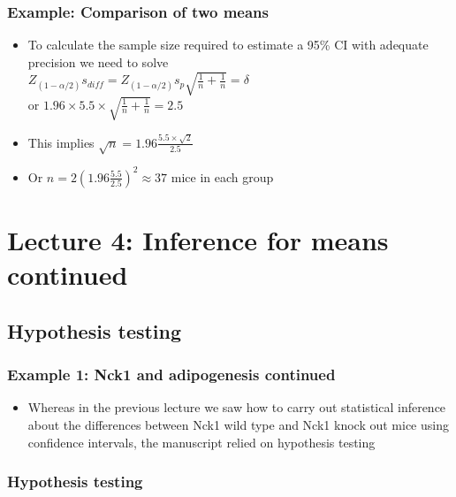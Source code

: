 \documentclass[
]{book}
\providecommand{\tightlist}{%
  \setlength{\itemsep}{0pt}\setlength{\parskip}{0pt}}
\begin{document}
\hypertarget{example-comparison-of-two-means}{%
\subsection{Example: Comparison of two means}\label{example-comparison-of-two-means}}

\begin{itemize}
\tightlist
\item
  To calculate the sample size required to estimate a 95\% CI with adequate precision we need to solve\\
  \(Z_{(1-\alpha/2)}s_{diff}=Z_{(1-\alpha/2)}s_p\sqrt{\frac{1}{n}+\frac{1}{n}}=\delta\)\\
  or \(1.96\times 5.5\times \sqrt{\frac{1}{n}+\frac{1}{n}}=2.5\)
\item
  This implies \(\sqrt n =1.96\frac{5.5\times\sqrt 2}{2.5}\)
\item
  Or \(n = 2(1.96\frac{5.5}{2.5})^2 \approx 37\) mice in each group
\end{itemize}

\hypertarget{lecture-4-inference-for-means-continued}{%
\chapter{Lecture 4: Inference for means continued}\label{lecture-4-inference-for-means-continued}}

\hypertarget{hypothesis-testing}{%
\section{Hypothesis testing}\label{hypothesis-testing}}

\hypertarget{example-1-nck1-and-adipogenesis-continued}{%
\subsection{Example 1: Nck1 and adipogenesis continued}\label{example-1-nck1-and-adipogenesis-continued}}

\begin{itemize}
\tightlist
\item
  Whereas in the previous lecture we saw how to carry out statistical inference about the differences between Nck1 wild type and Nck1 knock out mice using confidence intervals, the manuscript relied on hypothesis testing
\end{itemize}

\hypertarget{hypothesis-testing-1}{%
\subsection{Hypothesis testing}\label{hypothesis-testing-1}}
\end{document}
